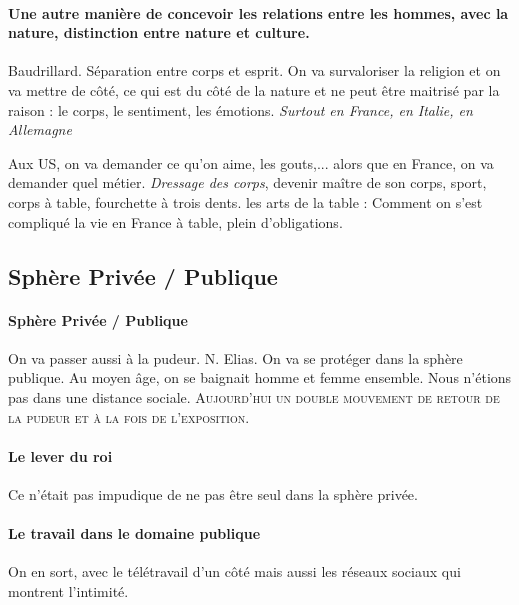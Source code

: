 \paragraph{Une autre manière de concevoir les relations entre les hommes, avec la nature, distinction entre
nature et culture.} Baudrillard. Séparation entre corps et esprit.
On va survaloriser la religion et on va mettre de côté, ce qui est du côté de la nature et ne peut être maitrisé par la raison : le corps, le sentiment, les émotions. \textit{Surtout en France, en Italie, en Allemagne}
\begin{Ex}
Aux US, on va demander ce qu'on aime, les gouts,... alors que en France, on va demander quel métier. 
\textit{Dressage des corps}, devenir maître de son corps, sport, corps à table, fourchette à trois dents.  les arts de la table : Comment on s'est compliqué la vie en France à table, plein d'obligations. 

\end{Ex}
\subsection{Sphère Privée / Publique}
\paragraph{Sphère Privée / Publique } On va passer aussi à la pudeur. N. Elias. On va se protéger dans la sphère publique. Au moyen âge, on se baignait homme et femme ensemble. Nous n'étions pas dans une distance sociale.\textsc{ Aujourd'hui un double mouvement de retour de la pudeur et à la fois de l'exposition.}

\paragraph{Le lever du roi} Ce n'était pas impudique de ne pas être seul dans la sphère privée.

\paragraph{Le travail dans le domaine publique} On en sort, avec le télétravail d'un côté mais aussi les réseaux sociaux qui montrent l'intimité.

